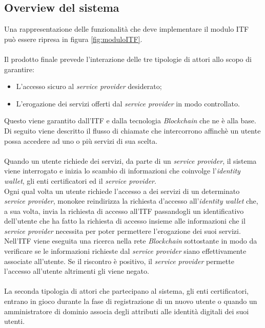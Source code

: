 \subsection{Overview del sistema}
Una rappresentazione delle funzionalità che deve implementare il modulo \gls{ITF} può essere ripresa in figura \ref{fig:moduloITF}.\\\\
Il prodotto finale prevede l'interazione delle tre tipologie di attori allo scopo di garantire:
\begin{itemize}
	\item L'accesso sicuro al \textit{service provider} desiderato;
	\item L'erogazione dei servizi offerti dal \textit{service provider} in modo controllato.
\end{itemize}
Questo viene garantito dall'\gls{ITF} e dalla tecnologia \textit{Blockchain} che ne è alla base.\\
Di seguito viene descritto il flusso di chiamate che intercorrono affinchè un utente possa accedere ad uno o più servizi di sua scelta.\\\\
Quando un utente richiede dei servizi, da parte di un \textit{service provider}, il sistema viene interrogato e inizia lo scambio di informazioni che coinvolge l'\textit{identity wallet}, gli enti certificatori ed il \textit{service provider}.\\
Ogni qual volta un utente richiede l'accesso a dei servizi di un determinato \textit{service provider}, \gls{monokee} reindirizza la richiesta d'accesso all'\textit{identity wallet} che, a sua volta, invia la richiesta di accesso all'\gls{ITF} passandogli un identificativo dell'utente che ha fatto la richiesta di accesso insieme alle informazioni che il \textit{service provider} necessita per poter permettere l'erogazione dei suoi servizi.\\
Nell'\gls{ITF} viene eseguita una ricerca nella rete \textit{Blockchain} sottostante in modo da verificare se le informazioni richieste dal \textit{service provider} siano effettivamente associate all'utente. Se il riscontro è positivo, il \textit{service provider} permette l'accesso all'utente altrimenti gli viene negato.\\\\
La seconda tipologia di attori che partecipano al sistema, gli enti certificatori, entrano in gioco durante la fase di registrazione di un nuovo utente o quando un amministratore di dominio associa degli attributi alle identità digitali dei suoi utenti.
